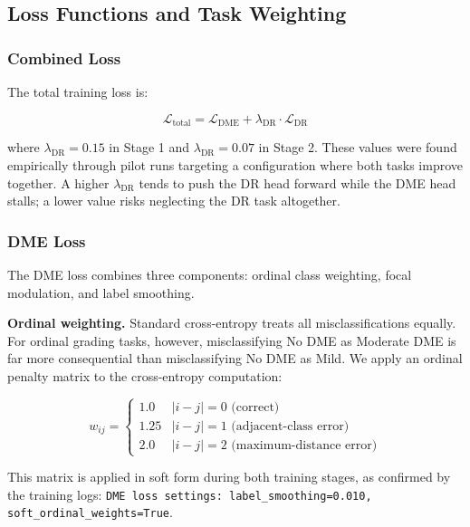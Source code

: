 \documentclass[12pt,a4paper]{article}
\begin{document}
\subsection{Loss Functions and Task Weighting}

\subsubsection{Combined Loss}

The total training loss is:

\begin{equation}
\mathcal{L}_{\text{total}} = \mathcal{L}_{\text{DME}} + \lambda_{\text{DR}} \cdot \mathcal{L}_{\text{DR}}
\label{eq:combined_loss}
\end{equation}

where $\lambda_{\text{DR}} = 0.15$ in Stage 1 and $\lambda_{\text{DR}} = 0.07$ in Stage 2. These values were found empirically through pilot runs targeting a configuration where both tasks improve together. A higher $\lambda_{\text{DR}}$ tends to push the DR head forward while the DME head stalls; a lower value risks neglecting the DR task altogether.

\subsubsection{DME Loss}

The DME loss combines three components: ordinal class weighting, focal modulation, and label smoothing.

\textbf{Ordinal weighting.} Standard cross-entropy treats all misclassifications equally. For ordinal grading tasks, however, misclassifying No DME as Moderate DME is far more consequential than misclassifying No DME as Mild. We apply an ordinal penalty matrix to the cross-entropy computation:

\begin{equation}
w_{ij} = \begin{cases} 1.0 & |i-j| = 0 \text{ (correct)} \\ 1.25 & |i-j| = 1 \text{ (adjacent-class error)} \\ 2.0 & |i-j| = 2 \text{ (maximum-distance error)} \end{cases}
\end{equation}

This matrix is applied in soft form during both training stages, as confirmed by the training logs: \texttt{DME loss settings: label\_smoothing=0.010, soft\_ordinal\_weights=True}.
\end{document}
